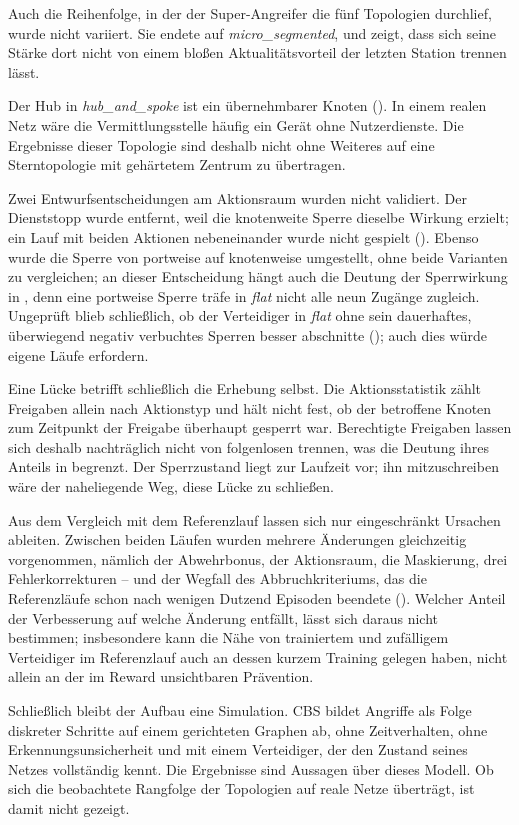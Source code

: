 Auch die Reihenfolge, in der der Super-Angreifer die fünf Topologien
durchlief, wurde nicht variiert. Sie endete auf \emph{micro\_segmented}, und
 zeigt, dass sich seine Stärke dort nicht von
einem bloßen Aktualitätsvorteil der letzten Station trennen lässt.

Der Hub in \emph{hub\_and\_spoke} ist ein übernehmbarer Knoten
(). In einem realen Netz wäre die Vermittlungsstelle
häufig ein Gerät ohne Nutzerdienste. Die Ergebnisse dieser Topologie sind
deshalb nicht ohne Weiteres auf eine Sterntopologie mit gehärtetem Zentrum zu
übertragen.

Zwei Entwurfsentscheidungen am Aktionsraum wurden nicht validiert. Der
Dienststopp wurde entfernt, weil die knotenweite Sperre dieselbe Wirkung
erzielt; ein Lauf mit beiden Aktionen nebeneinander wurde nicht gespielt
(). Ebenso wurde die Sperre
von portweise auf knotenweise umgestellt, ohne beide Varianten zu
vergleichen; an dieser Entscheidung hängt auch die Deutung der Sperrwirkung
in , denn eine portweise Sperre träfe in \emph{flat}
nicht alle neun Zugänge zugleich. Ungeprüft blieb schließlich, ob der Verteidiger in \emph{flat}
ohne sein dauerhaftes, überwiegend negativ verbuchtes Sperren besser
abschnitte (); auch dies würde eigene Läufe erfordern.

Eine Lücke betrifft schließlich die Erhebung selbst. Die Aktionsstatistik
zählt Freigaben allein nach Aktionstyp und hält nicht fest, ob der betroffene
Knoten zum Zeitpunkt der Freigabe überhaupt gesperrt war. Berechtigte
Freigaben lassen sich deshalb nachträglich nicht von folgenlosen trennen, was
die Deutung ihres Anteils in  begrenzt. Der Sperrzustand
liegt zur Laufzeit vor; ihn mitzuschreiben wäre der naheliegende Weg, diese
Lücke zu schließen.

Aus dem Vergleich mit dem Referenzlauf lassen sich nur eingeschränkt
Ursachen ableiten.
Zwischen beiden Läufen wurden mehrere Änderungen gleichzeitig vorgenommen,
nämlich der Abwehrbonus, der Aktionsraum, die Maskierung, drei
Fehlerkorrekturen -- und der Wegfall des Abbruchkriteriums, das die
Referenzläufe schon nach wenigen Dutzend Episoden beendete
(). Welcher Anteil der Verbesserung auf welche
Änderung entfällt, lässt sich daraus nicht bestimmen; insbesondere kann die
Nähe von trainiertem und zufälligem Verteidiger im Referenzlauf auch an
dessen kurzem Training gelegen haben, nicht allein an der im Reward
unsichtbaren Prävention.

Schließlich bleibt der Aufbau eine Simulation. \ac{CBS} bildet Angriffe als
Folge diskreter Schritte auf einem gerichteten Graphen ab, ohne Zeitverhalten,
ohne Erkennungsunsicherheit und mit einem Verteidiger, der den Zustand seines
Netzes vollständig kennt. Die Ergebnisse sind Aussagen über dieses Modell. Ob
sich die beobachtete Rangfolge der Topologien auf reale Netze überträgt, ist
damit nicht gezeigt.
